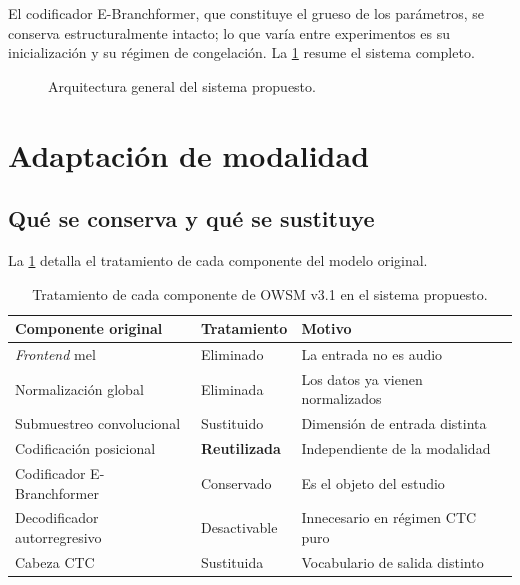 El codificador E-Branchformer, que constituye el grueso de los parámetros, se conserva estructuralmente intacto; lo que varía entre experimentos es su inicialización y su régimen de congelación. La \cref{fig:arquitectura-general} resume el sistema completo.

\begin{figure}[H]
  \centering
  \caption{Arquitectura general del sistema propuesto.}
  \label{fig:arquitectura-general}
\end{figure}

\section{Adaptación de modalidad}
\label{sec:adaptacion-modalidad}

\subsection{Qué se conserva y qué se sustituye}

La \cref{tab:conservado-sustituido} detalla el tratamiento de cada componente del modelo original.

\begin{table}[H]
  \centering
  \caption{Tratamiento de cada componente de OWSM v3.1 en el sistema propuesto.}
  \label{tab:conservado-sustituido}
  \small
  \begin{tabular}{lll}
    \toprule
    \textbf{Componente original} & \textbf{Tratamiento} & \textbf{Motivo} \\
    \midrule
    \textit{Frontend} mel        & Eliminado          & La entrada no es audio \\
    Normalización global         & Eliminada          & Los datos ya vienen normalizados \\
    Submuestreo convolucional    & Sustituido         & Dimensión de entrada distinta \\
    Codificación posicional      & \textbf{Reutilizada} & Independiente de la modalidad \\
    Codificador E-Branchformer   & Conservado         & Es el objeto del estudio \\
    Decodificador autorregresivo & Desactivable       & Innecesario en régimen CTC puro \\
    Cabeza CTC                   & Sustituida         & Vocabulario de salida distinto \\
    \bottomrule
  \end{tabular}
\end{table}

